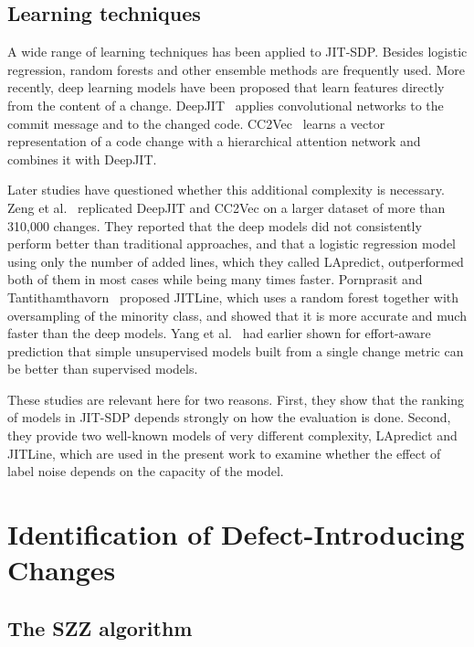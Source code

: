 \documentclass[12pt,a4paper,oneside]{report}
\begin{document}
\subsection{Learning techniques}

A wide range of learning techniques has been applied to JIT-SDP. Besides
logistic regression, random forests and other ensemble methods are frequently
used. More recently, deep learning models have been proposed that learn
features directly from the content of a change. DeepJIT~\cite{hoang2019deepjit}
applies convolutional networks to the commit message and to the changed code.
CC2Vec~\cite{hoang2020cc2vec} learns a vector representation of a code change
with a hierarchical attention network and combines it with DeepJIT.

Later studies have questioned whether this additional complexity is
necessary. Zeng et al.~\cite{zeng2021lapredict} replicated DeepJIT and CC2Vec
on a larger dataset of more than 310,000 changes. They reported that the deep
models did not consistently perform better than traditional approaches, and
that a logistic regression model using only the number of added lines, which
they called LApredict, outperformed both of them in most cases while being
many times faster. Pornprasit and
Tantithamthavorn~\cite{pornprasit2021jitline} proposed JITLine, which uses a
random forest together with oversampling of the minority class, and showed
that it is more accurate and much faster than the deep models. Yang et
al.~\cite{yang2016effort} had earlier shown for effort-aware prediction that
simple unsupervised models built from a single change metric can be better
than supervised models.

These studies are relevant here for two reasons. First, they show that the
ranking of models in JIT-SDP depends strongly on how the evaluation is done.
Second, they provide two well-known models of very different complexity,
LApredict and JITLine, which are used in the present work to examine whether
the effect of label noise depends on the capacity of the model.

\section{Identification of Defect-Introducing Changes}

\subsection{The SZZ algorithm}
\end{document}
